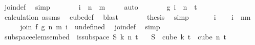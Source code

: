 \begin{isabellebody}
\ join{\isacharunderscore}{\kern0pt}def\ \isamarkupfalse%
\ simp\isanewline
\ \ \ \ \isamarkupfalse%
\ \isamarkupfalse%
\ {\isachardoublequoteopen}i\ {\isacharminus}{\kern0pt}\ n\ {\isasymin}\ {\isacharbraceleft}{\kern0pt}{\isachardot}{\kern0pt}{\isachardot}{\kern0pt}{\isacharless}{\kern0pt}m{\isacharbraceright}{\kern0pt}{\isachardoublequoteclose}\ \isamarkupfalse%
\ {}\ \isamarkupfalse%
\ auto\isanewline
\ \ \ \ \isamarkupfalse%
\ \isamarkupfalse%
\ {\isachardoublequoteopen}g\ {\isacharparenleft}{\kern0pt}i\ {\isacharminus}{\kern0pt}\ n{\isacharparenright}{\kern0pt}\ {\isasymin}\ {\isacharbraceleft}{\kern0pt}{\isachardot}{\kern0pt}{\isachardot}{\kern0pt}{\isacharless}{\kern0pt}t{\isacharplus}{\kern0pt}{}{\isacharbraceright}{\kern0pt}{\isachardoublequoteclose}\ \isamarkupfalse%
\ calculation{\isacharparenleft}{\kern0pt}{}{\isacharparenright}{\kern0pt}\ assms{\isacharparenleft}{\kern0pt}{}{\isacharparenright}{\kern0pt}\ \isamarkupfalse%
\ cube{\isacharunderscore}{\kern0pt}def\ \isamarkupfalse%
\ blast\isanewline
\ \ \ \ \isamarkupfalse%
\ \isamarkupfalse%
\ {\isacharquery}{\kern0pt}thesis\ \isamarkupfalse%
\ simp\isanewline
\ \ \isamarkupfalse%
\isanewline
{}\isamarkupfalse%
\isanewline
\ \ \isamarkupfalse%
\ i\isanewline
\ \ \isamarkupfalse%
\ {\isachardoublequoteopen}i\ {\isasymnotin}\ {\isacharbraceleft}{\kern0pt}{\isachardot}{\kern0pt}{\isachardot}{\kern0pt}{\isacharless}{\kern0pt}n{\isacharplus}{\kern0pt}m{\isacharbraceright}{\kern0pt}{\isachardoublequoteclose}\isanewline
\ \ \isamarkupfalse%
\ \isamarkupfalse%
\ {\isachardoublequoteopen}join\ f\ g\ n\ m\ i\ {\isacharequal}{\kern0pt}\ undefined{\isachardoublequoteclose}\ \isamarkupfalse%
\ join{\isacharunderscore}{\kern0pt}def\ \isamarkupfalse%
\ simp\isanewline
{}\isamarkupfalse%
%
\endisatagproof
{\isafoldproof}%
%
\isadelimproof
\isanewline
%
\endisadelimproof
\isanewline
{}\isamarkupfalse%
\ subspace{\isacharunderscore}{\kern0pt}elems{\isacharunderscore}{\kern0pt}embed{\isacharcolon}{\kern0pt}\ \ {\isachardoublequoteopen}is{\isacharunderscore}{\kern0pt}subspace\ S\ k\ n\ t{\isachardoublequoteclose}\isanewline
\ \ \ {\isachardoublequoteopen}S\ {\isacharbackquote}{\kern0pt}\ {\isacharparenleft}{\kern0pt}cube\ k\ t{\isacharparenright}{\kern0pt}\ {\isasymsubseteq}\ cube\ n\ t{\isachardoublequoteclose}\isanewline

\end{isabellebody}
